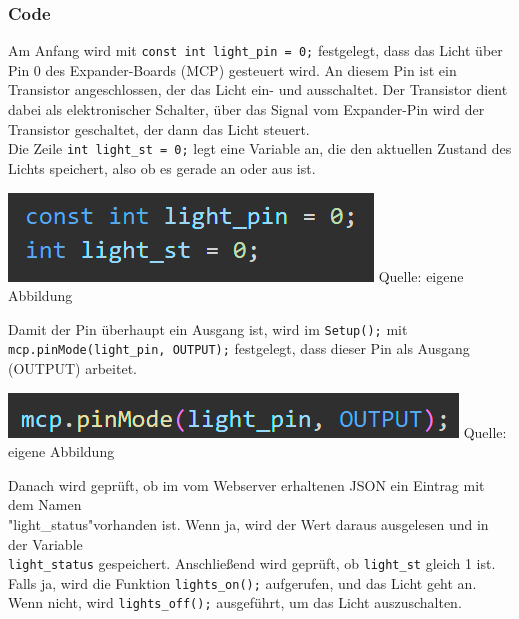 \documentclass[ngerman,12pt,a4paper]{article}
\begin{document}
		\subsubsection{Code}
		Am Anfang wird mit \texttt{const int light\_pin = 0;} festgelegt, dass das Licht über Pin 0 des Expander-Boards (MCP) gesteuert wird. An diesem Pin ist ein Transistor angeschlossen, der das Licht ein- und ausschaltet. Der Transistor dient dabei als elektronischer Schalter, über das Signal vom Expander-Pin wird der Transistor geschaltet, der dann das Licht steuert.\\
		Die Zeile \texttt{int light\_st = 0;} legt eine Variable an, die den aktuellen Zustand des Lichts speichert, also ob es gerade an oder aus ist. 
		\begin{center}
			\begin{minipage}{0.8\textwidth}
				\centering
				\includegraphics[width=\textwidth]{Pictures/code_licht_pins}
				\label{fig:code_licht_pins}
				\vspace{-3pt}
				{\small Quelle: {eigene Abbildung}}
				\vspace{0.5cm}
			\end{minipage}
		\end{center}
		Damit der Pin überhaupt ein Ausgang ist, wird im \texttt{Setup();} mit \texttt{mcp.pinMode(light\_pin, OUTPUT);} festgelegt, dass dieser Pin als Ausgang (OUTPUT) arbeitet.
		\begin{center}
			\begin{minipage}{0.8\textwidth}
				\centering
				\includegraphics[width=\textwidth]{Pictures/code_licht_setup}
				\label{fig:code_licht_setup}
				\vspace{-3pt}
				{\small Quelle: {eigene Abbildung}}
				\vspace{0.5cm}
			\end{minipage}
		\end{center}
		Danach wird geprüft, ob im vom Webserver erhaltenen JSON ein Eintrag mit dem Namen\\ "light\_status"vorhanden ist. Wenn ja, wird der Wert daraus ausgelesen und in der Variable \\ \texttt{light\_status} gespeichert.
		Anschließend wird geprüft, ob \texttt{light\_st} gleich 1 ist. Falls ja, wird die Funktion \texttt{lights\_on();} aufgerufen, und das Licht geht an. Wenn nicht, wird \texttt{lights\_off();} ausgeführt, um das Licht auszuschalten.
		
\end{document}
